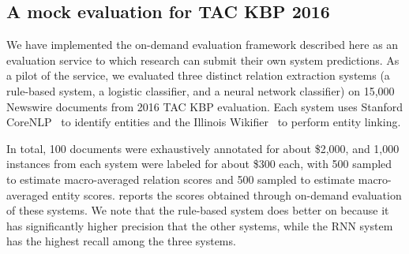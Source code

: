 \subsection{A mock evaluation for TAC KBP 2016}
We have implemented the on-demand evaluation framework described here as an evaluation service to which research can submit their own system predictions.
As a pilot of the service, we evaluated three distinct relation extraction systems (a rule-based system, a logistic classifier, and a neural network classifier) on 15,000 Newswire documents from 2016 TAC KBP evaluation.
Each system uses Stanford CoreNLP~\citep{manning2014stanford} to identify entities and the Illinois Wikifier~\citep{ratinov2011local} to perform entity linking. 

In total, 100 documents were exhaustively annotated for about \$2,000, and 1,000 instances from each system were labeled for about \$300 each, with 500 sampled to estimate macro-averaged relation scores and 500 sampled to estimate macro-averaged entity scores.
 reports the scores obtained through on-demand evaluation of these systems.
We note that the rule-based system does better on \fone{} because it has significantly higher precision that the other systems, while the RNN system has the highest recall among the three systems.
